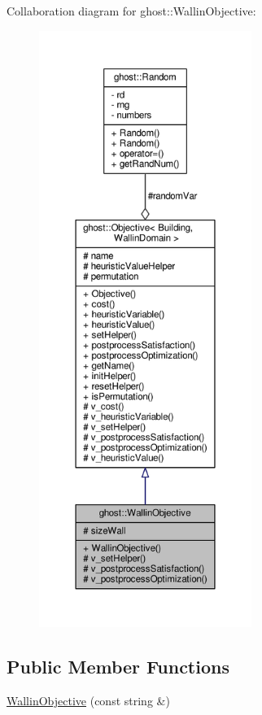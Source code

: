Collaboration diagram for ghost\-:\-:Wallin\-Objective\-:\nopagebreak
\begin{figure}[H]
\begin{center}
\leavevmode
\includegraphics[height=550pt]{classghost_1_1WallinObjective__coll__graph}
\end{center}
\end{figure}
\subsection*{Public Member Functions}
\begin{DoxyCompactItemize}
\item 
\hyperlink{classghost_1_1WallinObjective_a4730f5d345b053d92b9c55b5ebfe5716}{Wallin\-Objective} (const string \&)
\end{DoxyCompactItemize}
